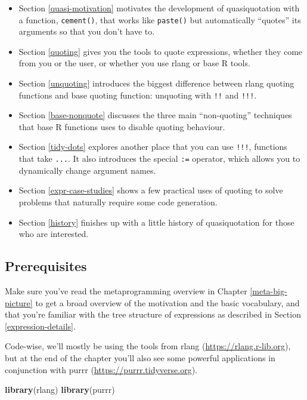 \documentclass[]{book}
\newenvironment{Shaded}{\begin{snugshade}}{\end{snugshade}}
\newcommand{\KeywordTok}[1]{\textcolor[rgb]{0.27,0.27,0.27}{\textbf{#1}}}
\newcommand{\NormalTok}[1]{#1}
\renewcommand{\href}[2]{#2 (\url{#1})}
\begin{document}
\begin{itemize}
\item
  Section \ref{quasi-motivation} motivates the development of quasiquotation
  with a function, \texttt{cement()}, that works like \texttt{paste()} but automatically
  ``quotes'' its arguments so that you don't have to.
\item
  Section \ref{quoting} gives you the tools to quote expressions, whether
  they come from you or the user, or whether you use rlang or base R tools.
\item
  Section \ref{unquoting} introduces the biggest difference between rlang
  quoting functions and base quoting function: unquoting with \texttt{!!} and \texttt{!!!}.
\item
  Section \ref{base-nonquote} discusses the three main ``non-quoting''
  techniques that base R functions uses to disable quoting behaviour.
\item
  Section \ref{tidy-dots} explores another place that you can use \texttt{!!!},
  functions that take \texttt{...}. It also introduces the special \texttt{:=} operator,
  which allows you to dynamically change argument names.
\item
  Section \ref{expr-case-studies} shows a few practical uses of quoting to solve
  problems that naturally require some code generation.
\item
  Section \ref{history} finishes up with a little history of quasiquotation
  for those who are interested.
\end{itemize}

\hypertarget{prerequisites-2}{%
\subsection*{Prerequisites}\label{prerequisites-2}}

Make sure you've read the metaprogramming overview in Chapter \ref{meta-big-picture} to get a broad overview of the motivation and the basic vocabulary, and that you're familiar with the tree structure of expressions as described in Section \ref{expression-details}.

Code-wise, we'll mostly be using the tools from \href{https://rlang.r-lib.org}{rlang}, but at the end of the chapter you'll also see some powerful applications in conjunction with \href{https://purrr.tidyverse.org}{purrr}.

\begin{Shaded}
\begin{Highlighting}[]
\KeywordTok{library}\NormalTok{(rlang)}
\KeywordTok{library}\NormalTok{(purrr)}
\end{Highlighting}
\end{Shaded}
\end{document}
